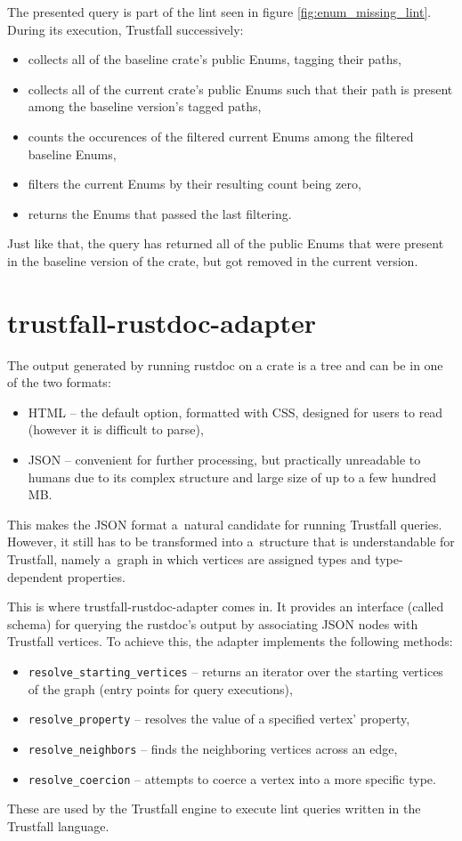 \documentclass[licencjacka,en]{pracamgr}
\begin{document}
The presented query is part of the lint seen in figure \ref{fig:enum_missing_lint}.
During its execution, Trustfall successively:
\begin{itemize}
	\item collects all of the baseline crate's public Enums, tagging their paths,
	\item collects all of the current crate's public Enums such that their path is present among
		the baseline version's tagged paths,
	\item counts the occurences of the filtered current Enums among the filtered baseline Enums,
	\item filters the current Enums by their resulting count being zero,
	\item returns the Enums that passed the last filtering.
\end{itemize}
Just like that, the query has returned all of the public Enums that were present in the baseline
version of the crate, but got removed in the current version.

\section{trustfall-rustdoc-adapter}\label{r:section_trustfall_rustdoc_adapter}
The output generated by running rustdoc on a crate is a tree and can be in one of the two formats:
\begin{itemize}
	\item HTML -- the default option, formatted with CSS, designed for users to read (however it is
		difficult to parse),
	\item JSON -- convenient for further processing, but practically unreadable to humans due to its
		complex structure and large size of up to a few hundred MB.
\end{itemize}
This makes the JSON format a~natural candidate for running Trustfall queries. However, it still has
to be transformed into a~structure that is understandable for Trustfall, namely a~graph in which
vertices are assigned types and type-dependent properties.

This is where trustfall-rustdoc-adapter comes in. It provides an interface (called schema) for querying
the rustdoc's output by associating JSON nodes with Trustfall vertices. To achieve this, the adapter
implements the following methods:
\begin{itemize}
	\item \texttt{resolve\_starting\_vertices} -- returns an iterator over the starting vertices of
		the graph (entry points for query executions),
	\item \texttt{resolve\_property} -- resolves the value of a specified vertex' property,
	\item \texttt{resolve\_neighbors} -- finds the neighboring vertices across an edge,
	\item \texttt{resolve\_coercion} -- attempts to coerce a vertex into a more specific type.
\end{itemize}
These are used by the Trustfall engine to execute lint queries written in the Trustfall language.
\end{document}
